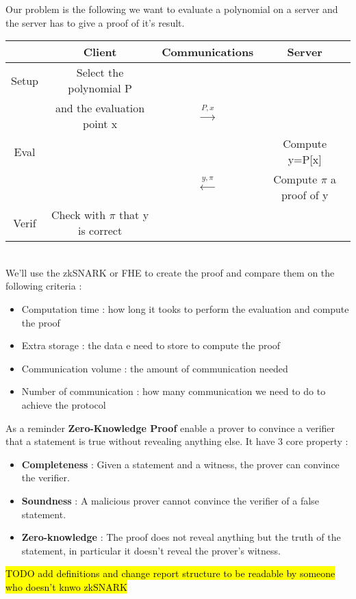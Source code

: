 Our problem is the following we want to evaluate a polynomial on a server and the server has to give a proof of it's result. 

\begin{tabular}{|c|c c c|}
  \hline
  & \textbf{Client} & \textbf{Communications} & \textbf{Server} \TBstrut\\
  \hline
  Setup & Select the polynomial P & & \Tstrut \\
  & and the evaluation point x &  $\xrightarrow[]{P, x}$ & \Tstrut \\
  \hline
  Eval & & & Compute y=P[x] \Tstrut \\
  & & $\xleftarrow[]{y, \pi}$ & Compute $\pi$ a proof of y \\
  \hline
  Verif & Check with $\pi$ that y is correct & & \Tstrut \\
  \hline
\end{tabular} \\



We'll use the zkSNARK or FHE to create the proof and compare them on the following criteria :

\begin{itemize}
    \item Computation time : how long it tooks to perform the evaluation and compute the proof
    \item Extra storage : the data e need to store to compute the proof 
    \item Communication volume : the amount of communication needed 
    \item Number of communication : how many communication we need to do to achieve the protocol
\end{itemize}
As a reminder \textbf{Zero-Knowledge Proof} enable a prover to convince a verifier that a statement is true without revealing anything else. It have 3 core property :
\begin{itemize}
  \item \textbf{Completeness} : Given a statement and a witness, the prover can convince the verifier.
  \item \textbf{Soundness} : A malicious prover cannot convince the verifier of a false statement.
  \item \textbf{Zero-knowledge} : The proof does not reveal anything but the truth of the statement, in particular it doesn't reveal the prover's witness.
\end{itemize}
\hl{TODO add definitions and change report structure to be readable by someone who doesn't knwo zkSNARK}